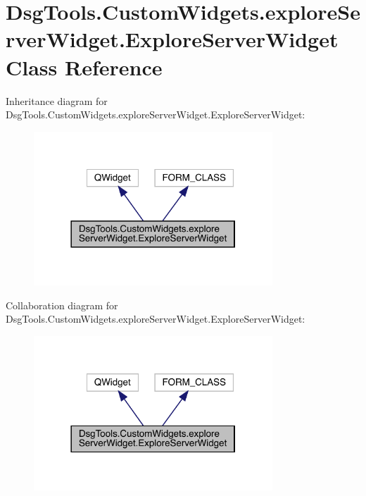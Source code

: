 \hypertarget{class_dsg_tools_1_1_custom_widgets_1_1explore_server_widget_1_1_explore_server_widget}{}\section{Dsg\+Tools.\+Custom\+Widgets.\+explore\+Server\+Widget.\+Explore\+Server\+Widget Class Reference}
\label{class_dsg_tools_1_1_custom_widgets_1_1explore_server_widget_1_1_explore_server_widget}


Inheritance diagram for Dsg\+Tools.\+Custom\+Widgets.\+explore\+Server\+Widget.\+Explore\+Server\+Widget\+:
\nopagebreak
\begin{figure}[H]
\begin{center}
\leavevmode
\includegraphics[width=254pt]{class_dsg_tools_1_1_custom_widgets_1_1explore_server_widget_1_1_explore_server_widget__inherit__graph}
\end{center}
\end{figure}


Collaboration diagram for Dsg\+Tools.\+Custom\+Widgets.\+explore\+Server\+Widget.\+Explore\+Server\+Widget\+:
\nopagebreak
\begin{figure}[H]
\begin{center}
\leavevmode
\includegraphics[width=254pt]{class_dsg_tools_1_1_custom_widgets_1_1explore_server_widget_1_1_explore_server_widget__coll__graph}
\end{center}
\end{figure}
